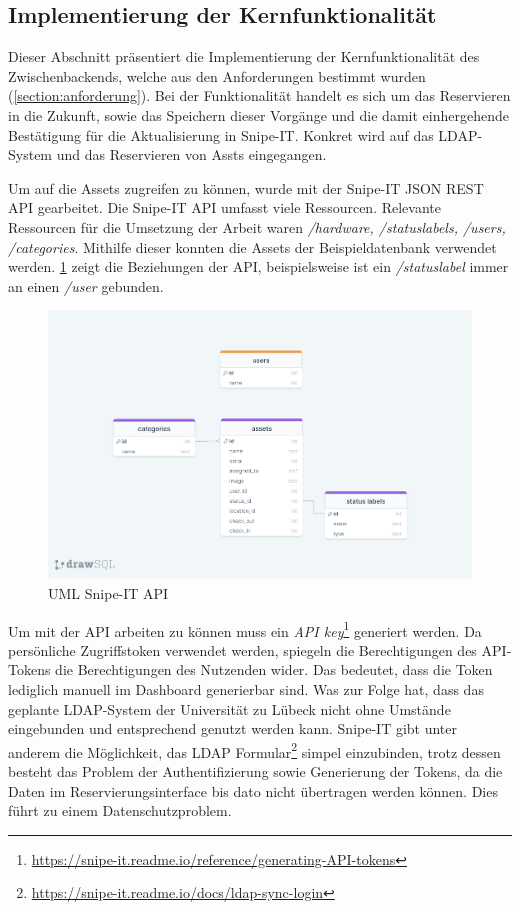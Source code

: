 \subsection{Implementierung der Kernfunktionalität}  Dieser Abschnitt präsentiert die
Implementierung der Kernfunktionalität des Zwischenbackends, welche aus den
Anforderungen bestimmt wurden (\ref{section:anforderung}). Bei der
Funktionalität handelt es sich um das Reservieren in die Zukunft, sowie das
Speichern dieser Vorgänge und die damit einhergehende Bestätigung für die
Aktualisierung in Snipe-IT. Konkret wird auf das LDAP-System und das
Reservieren von Assts eingegangen.

Um auf die Assets zugreifen zu können, wurde mit der Snipe-IT JSON REST API
gearbeitet. Die Snipe-IT API umfasst viele Ressourcen. Relevante Ressourcen für
die Umsetzung der Arbeit waren \textit{/hardware, /statuslabels, /users,
  /categories}. Mithilfe dieser konnten die Assets der Beispieldatenbank verwendet
werden. \ref{fig:snipe} zeigt die Beziehungen der API, beispielsweise ist ein
\textit{/statuslabel} immer an einen \textit{/user} gebunden.

\begin{figure}[h]
  \centering
  \includegraphics[scale=0.2]{Bilder/drawSQL-export-2022-10-12_17 27.png}
  \caption[UML Snipe-IT API]{UML Snipe-IT API}
  \label{fig:snipe}
\end{figure}

Um mit der API arbeiten zu können muss ein \textit{API
  key}\footnote{\url{https://snipe-it.readme.io/reference/generating-API-tokens}}
generiert werden. Da persönliche Zugriffstoken verwendet werden, spiegeln die
Berechtigungen des API-Tokens die Berechtigungen des Nutzenden wider. Das
bedeutet, dass die Token lediglich manuell im Dashboard generierbar sind. Was
zur Folge hat, dass das geplante LDAP-System der Universität zu Lübeck nicht
ohne Umstände eingebunden und entsprechend genutzt werden kann. Snipe-IT gibt
unter anderem die Möglichkeit, das LDAP
Formular\footnote{\url{https://snipe-it.readme.io/docs/ldap-sync-login}}
simpel einzubinden, trotz dessen besteht das Problem der Authentifizierung
sowie Generierung der Tokens, da die Daten im Reservierungsinterface bis dato
nicht übertragen werden können. Dies führt zu einem Datenschutzproblem.


